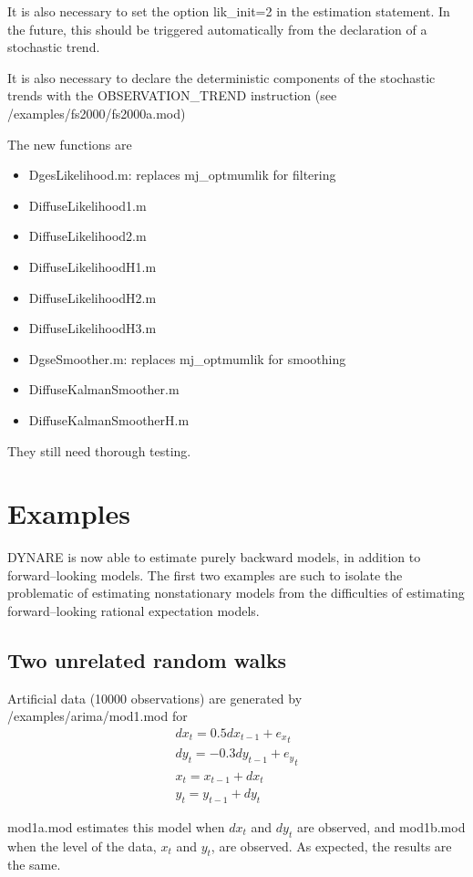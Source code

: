 \documentclass{article}
\begin{document}
It is also necessary to set the option lik\_init=2 in the estimation statement.
In the future, this should be triggered automatically from the declaration of a stochastic trend.

It is also necessary to declare the deterministic components of the stochastic trends with the OBSERVATION\_TREND instruction (see /examples/fs2000/fs2000a.mod)

The new functions are
\begin{itemize}
\item DgesLikelihood.m: replaces mj\_optmumlik for filtering
\item DiffuseLikelihood1.m
\item DiffuseLikelihood2.m
\item DiffuseLikelihoodH1.m
\item DiffuseLikelihoodH2.m
\item DiffuseLikelihoodH3.m
\item DgseSmoother.m: replaces mj\_optmumlik for smoothing
\item DiffuseKalmanSmoother.m
\item DiffuseKalmanSmootherH.m
\end{itemize}
They still need thorough testing.

\section{Examples}

DYNARE is now able to estimate purely backward models, in addition to forward--looking models. The first two examples are such to isolate the problematic of estimating nonstationary models from the difficulties of estimating forward--looking rational expectation models.

\subsection{Two unrelated random walks}
Artificial data (10000 observations) are generated by /examples/arima/mod1.mod for
\begin{eqnarray*}
  dx_t = 0.5dx_{t-1}+{e_x}_t\\
  dy_t = -0.3dy_{t-1}+{e_y}_t\\
  x_t = x_{t-1}+dx_t\\
  y_t = y_{t-1}+dy_t
\end{eqnarray*}

mod1a.mod estimates this model when $dx_t$ and $dy_t$ are observed, and
mod1b.mod when the level of the data, $x_t$ and $y_t$, are observed. As expected, the results are the same.
\end{document}
